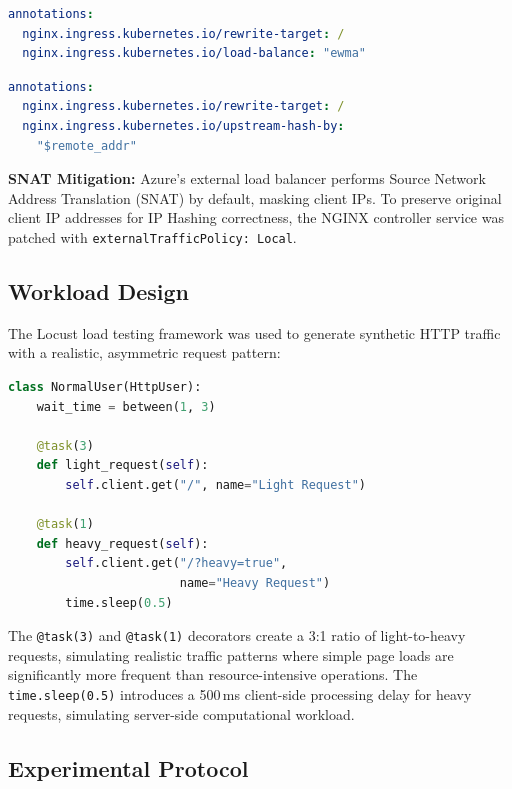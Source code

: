 \documentclass[conference]{IEEEtran}
\begin{document}
\begin{lstlisting}[language=yaml, caption={EWMA (Least Connections) Ingress}, label={lst:ewma}]
annotations:
  nginx.ingress.kubernetes.io/rewrite-target: /
  nginx.ingress.kubernetes.io/load-balance: "ewma"
\end{lstlisting}

\begin{lstlisting}[language=yaml, caption={IP Hash Ingress}, label={lst:iphash}]
annotations:
  nginx.ingress.kubernetes.io/rewrite-target: /
  nginx.ingress.kubernetes.io/upstream-hash-by:
    "$remote_addr"
\end{lstlisting}

\textbf{SNAT Mitigation:} Azure's external load balancer performs Source Network Address Translation (SNAT) by default, masking client IPs. To preserve original client IP addresses for IP Hashing correctness, the NGINX controller service was patched with \texttt{externalTrafficPolicy: Local}.

\subsection{Workload Design}

The Locust load testing framework was used to generate synthetic HTTP traffic with a realistic, asymmetric request pattern:

\begin{lstlisting}[language=Python, caption={Locust workload definition}, label={lst:locust}]
class NormalUser(HttpUser):
    wait_time = between(1, 3)

    @task(3)
    def light_request(self):
        self.client.get("/", name="Light Request")

    @task(1)
    def heavy_request(self):
        self.client.get("/?heavy=true",
                        name="Heavy Request")
        time.sleep(0.5)
\end{lstlisting}

The \texttt{@task(3)} and \texttt{@task(1)} decorators create a 3:1 ratio of light-to-heavy requests, simulating realistic traffic patterns where simple page loads are significantly more frequent than resource-intensive operations. The \texttt{time.sleep(0.5)} introduces a 500\,ms client-side processing delay for heavy requests, simulating server-side computational workload.

\subsection{Experimental Protocol}
\end{document}

